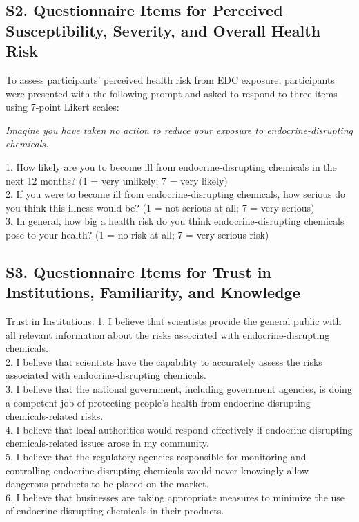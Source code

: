 \subsection{S2. Questionnaire Items for Perceived Susceptibility, Severity, and Overall Health Risk}
To assess participants' perceived health risk from EDC exposure, participants were presented with the following prompt and asked to respond to three items using 7-point Likert scales:

\emph{Imagine you have taken no action to reduce your exposure to endocrine-disrupting chemicals.}

1. How likely are you to become ill from endocrine-disrupting chemicals in the next 12 months? (1 = very unlikely; 7 = very likely)
\\2. If you were to become ill from endocrine-disrupting chemicals, how serious do you think this illness would be? (1 = not serious at all; 7 = very serious)
\\3. In general, how big a health risk do you think endocrine-disrupting chemicals pose to your health? (1 = no risk at all; 7 = very serious risk)

\subsection{S3. Questionnaire Items for Trust in Institutions, Familiarity, and Knowledge}
Trust in Institutions:
1. I believe that scientists provide the general public with all relevant information about the risks associated with endocrine-disrupting chemicals.
\\2. I believe that scientists have the capability to accurately assess the risks associated with endocrine-disrupting chemicals.
\\3. I believe that the national government, including government agencies, is doing a competent job of protecting people's health from endocrine-disrupting chemicals-related risks.
\\4. I believe that local authorities would respond effectively if endocrine-disrupting chemicals-related issues arose in my community.
\\5. I believe that the regulatory agencies responsible for monitoring and controlling endocrine-disrupting chemicals would never knowingly allow dangerous products to be placed on the market.
\\6. I believe that businesses are taking appropriate measures to minimize the use of endocrine-disrupting chemicals in their products.

